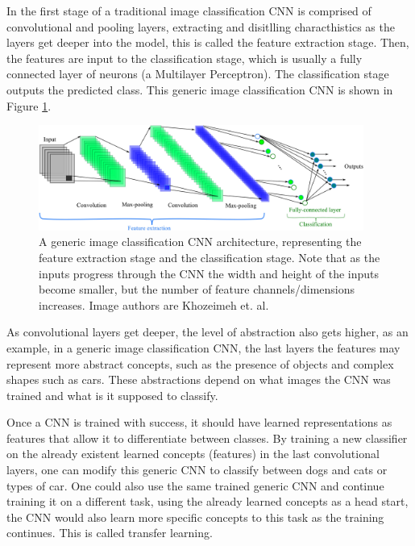 In the first stage of a traditional image classification CNN is comprised of convolutional and pooling layers, extracting and disitlling characthistics as the layers get deeper into the model, this is called the feature extraction stage. Then, the features are input to the classification stage, which is usually a fully connected layer of neurons (a Multilayer Perceptron). The classification stage outputs 
the predicted class. This generic image classification CNN is shown in Figure \ref{fig:generic-cnn}.
\begin{figure}[!ht]
    \centering
    \includegraphics[width=0.95\textwidth]{img/generic-convnet.png}
    \caption{A generic image classification CNN architecture, representing the feature extraction stage and the classification stage. Note that as the inputs progress through the CNN the width and height of the inputs become smaller, but the number of feature channels/dimensions increases. Image authors are Khozeimeh et. al.\cite{khozeimeh2021cnnimage}}
    \label{fig:generic-cnn}
\end{figure}

As convolutional layers get deeper, the level of abstraction also gets higher, as an example, in a generic image classification CNN, the last layers the features may represent more abstract concepts, such as the presence of objects and complex shapes such as cars. These abstractions depend on what images the CNN was trained and what is it supposed to classify. 

Once a CNN is trained with success, it should have learned representations as features that allow it to differentiate between classes. By training a new classifier on the already existent learned concepts (features) in the last convolutional layers, one can modify this generic CNN to classify between dogs and cats or types of car. One could also use the same trained generic CNN and continue training it on a different task, using the already learned concepts as a head start, the CNN would also learn more specific concepts to this task as the training continues. This is called transfer learning. 

